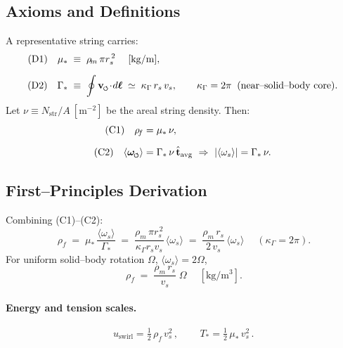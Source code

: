 \documentclass[11pt, a4paper]{article}
\newcommand{\swirlarrow}{%
    \mathchoice{\mkern-2mu\scriptstyle\boldsymbol{\circlearrowleft}}%
    {\mkern-2mu\scriptstyle\boldsymbol{\circlearrowleft}}%
    {\mkern-2mu\scriptscriptstyle\boldsymbol{\circlearrowleft}}%
    {\mkern-2mu\scriptscriptstyle\boldsymbol{\circlearrowleft}}%
}
\newcommand{\vswirl}{\mathbf{v}_{\swirlarrow}}
\newcommand{\omegas}{\boldsymbol{\omega}_{\swirlarrow}}  %
\newcommand{\vscore}{v_s}                                %
\newcommand{\rhof}{\rho_{\!f}}                           %
\newcommand{\rhom}{\rho_{\!m}}                           %
\newcommand{\rs}{r_s}                                    %
\begin{document}
    \subsection{Axioms and Definitions}
    A representative string carries:
    \begin{align}
        \text{(D1)}\quad
        \mu_\ast &\;\equiv\; \rhom\,\pi \rs^{\,2}
        \quad\;[\mathrm{kg/m}], \\[2mm]
        \text{(D2)}\quad
        \Gamma_\ast &\;\equiv\; \oint \vswirl\!\cdot\! d\boldsymbol{\ell}
        \;\simeq\; \kappa_\Gamma\, \rs\, \vscore,
        \qquad \kappa_\Gamma=2\pi \;\; \text{(near–solid–body core)}.
    \end{align}
    Let
    \(
    \nu \equiv N_{\text{str}}/A \ [\mathrm{m^{-2}}]
    \)
    be the areal string density. Then:
    \begin{align}
        \text{(C1)}\quad
        \rhof &= \mu_\ast\,\nu, \\[2mm]
        \text{(C2)}\quad
        \langle \omegas\rangle &= \Gamma_\ast\,\nu\,\hat{\mathbf{t}}_{\text{avg}}
        \ \Rightarrow\  |\langle\omega_s\rangle|=\Gamma_\ast\,\nu.
    \end{align}

    \subsection{First–Principles Derivation}
    Combining (C1)–(C2):
    \begin{equation}
        \boxed{\;
        \rhof
        \;=\; \mu_\ast\,\frac{\langle\omega_s\rangle}{\Gamma_\ast}
        \;=\; \frac{\rhom\,\pi \rs^{\,2}}{\kappa_\Gamma \rs \vscore}\,\langle\omega_s\rangle
        \;=\; \frac{\rhom\,\rs}{2\,\vscore}\,\langle\omega_s\rangle
        \;}
        \quad (\kappa_\Gamma=2\pi).
        \label{eq:rhof_from_omega}
    \end{equation}
    For uniform solid–body rotation \(\Omega\), \(\langle\omega_s\rangle=2\Omega\),
    \begin{equation}
        \boxed{\;
        \rhof
        \;=\; \frac{\rhom\,\rs}{\vscore}\;\Omega
        \;}
        \quad [\mathrm{kg/m^3}].
        \label{eq:rhof_from_Omega}
    \end{equation}

    \paragraph{Energy and tension scales.}
    \[
        \boxed{\, u_{\text{swirl}}=\tfrac12\,\rhof\,\vscore^2 \,},\qquad
        \boxed{\, T_\ast = \tfrac12\,\mu_\ast\,\vscore^2 \,}.
    \]
\end{document}
